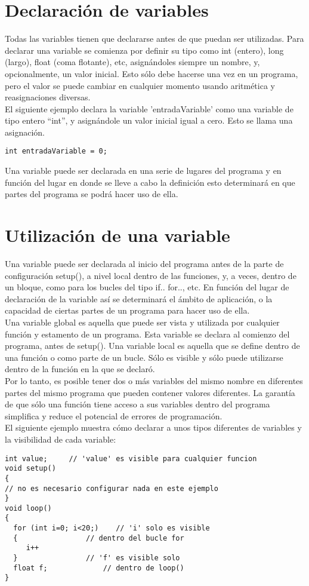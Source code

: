 \section{Declaración de variables}
Todas las variables tienen que declararse antes de que puedan ser utilizadas. Para declarar una variable se comienza por definir su tipo como int (entero), long (largo), float (coma flotante), etc, asignándoles siempre un nombre, y, opcionalmente, un valor inicial. Esto sólo debe hacerse una vez en un programa, pero el valor se puede cambiar en cualquier momento usando aritmética y reasignaciones diversas.\\
El siguiente ejemplo declara la variable 'entradaVariable' como una variable de tipo entero “int”, y asignándole un valor inicial igual a cero. Esto se llama una asignación.
\begin{lstlisting}
int entradaVariable = 0;
\end{lstlisting}

Una variable puede ser declarada en una serie de lugares del programa y en función del lugar en donde se lleve a cabo la definición esto determinará en que partes del programa se podrá hacer uso de ella.

\section{Utilización de una variable}

Una variable puede ser declarada al inicio del programa antes de la parte de configuración setup(), a nivel local dentro de las funciones, y, a veces, dentro de un bloque, como para los bucles del tipo if.. for.., etc. En función del lugar de declaración de la variable así se determinará el ámbito de aplicación, o la capacidad de ciertas partes de un programa para hacer uso de ella.\\
Una variable global es aquella que puede ser vista y utilizada por cualquier función y estamento de un programa. Esta variable se declara al comienzo del programa, antes de setup().
Una variable local es aquella que se define dentro de una función o como parte de un bucle. Sólo es visible y sólo puede utilizarse dentro de la función en la que se declaró.\\
Por lo tanto, es posible tener dos o más variables del mismo nombre en diferentes partes del mismo programa que pueden contener valores diferentes. La garantía de que sólo una función tiene acceso a sus variables dentro del programa simplifica y reduce el potencial de errores de programación.\\
El siguiente ejemplo muestra cómo declarar a unos tipos diferentes de variables y la visibilidad de cada variable:
\begin{lstlisting}
int value;     // 'value' es visible para cualquier funcion
void setup()
{
// no es necesario configurar nada en este ejemplo
}
void loop()
{
  for (int i=0; i<20;)    // 'i' solo es visible
  {                // dentro del bucle for
     i++   
  }                // 'f' es visible solo
  float f;             // dentro de loop()
}
\end{lstlisting}